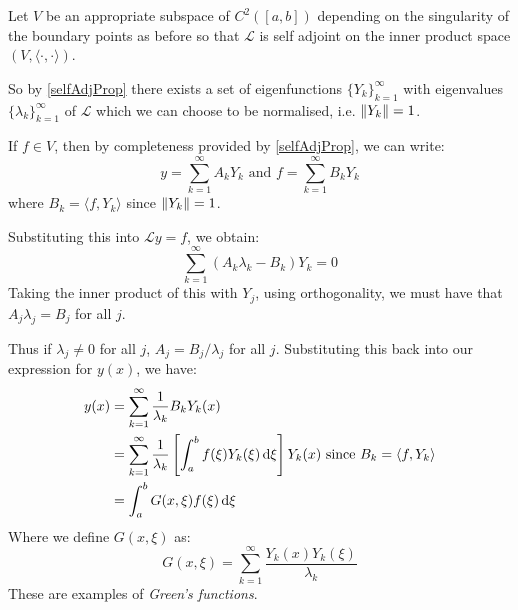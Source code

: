 \documentclass[../main.tex]{subfiles}
\begin{document}
Let $V$ be an appropriate subspace of $C^2([a, b])$ depending on the singularity of the boundary points as before so that $\mathcal{L}$ is self adjoint on the inner product space $(V, \langle \cdot, \cdot \rangle)$.

So by \cref{selfAdjProp} there exists a set of eigenfunctions $\{Y_k\}_{k = 1}^\infty$ with eigenvalues $\{\lambda_k\}_{k = 1}^\infty$ of $\mathcal{L}$ which we can choose to be normalised, i.e. $\left\lVert Y_k \right\rVert = 1$.

If $f \in V$, then by completeness provided by \cref{selfAdjProp}, we can write:
\[
  y = \sum_{k = 1}^{\infty} A_k Y_k \text{ and } f = \sum_{k = 1}^{\infty} B_k Y_k
\]
where $B_k = \langle f, Y_k \rangle$ since $\left\lVert Y_k \right\rVert = 1$.

Substituting this into $\mathcal{L} y = f$, we obtain:
\[
  \sum_{k = 1}^{\infty} (A_k \lambda_k - B_k)Y_k = 0
\]
Taking the inner product of this with $Y_j$, using orthogonality, we must have that $A_j \lambda_j = B_j$ for all $j$.

Thus if $\lambda_j \neq 0$ for all $j$, $A_j = B_j/\lambda_j$ for all $j$.
Substituting this back into our expression for $y(x)$, we have:
\begin{align*}
  y(x) &= \sum_{k = 1}^{\infty} \frac{1}{\lambda_k} B_k Y_k(x) \\
       &= \sum_{k = 1}^{\infty} \frac{1}{\lambda_k} \left[\int_{a}^{b} f(\xi) Y_k(\xi) \d{\xi}\right]Y_k(x) \text{ since $B_k = \langle f, Y_k \rangle$}\\
       &= \int_{a}^{b} G(x, \xi) f(\xi) \d{\xi}
\end{align*}
Where we define $G(x, \xi)$ as:
\[
  G(x, \xi) = \sum_{k = 1}^{\infty} \frac{Y_k(x)Y_k(\xi)}{\lambda_k}
\]
These are examples of \textit{Green's functions}.
\end{document}
